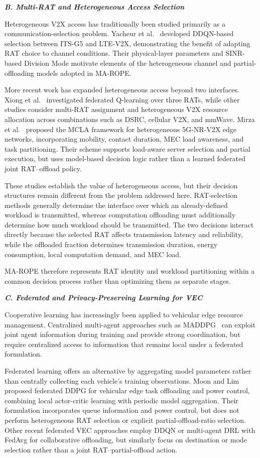 \textbf{\textit{B. Multi-RAT and Heterogeneous Access Selection}}

Heterogeneous V2X access has traditionally been studied primarily as a communication-selection problem. Yacheur et al.~\cite{yacheur2023} developed DDQN-based selection between ITS-G5 and LTE-V2X, demonstrating the benefit of adapting RAT choice to channel conditions. Their physical-layer parameters and SINR-based Division Mode motivate elements of the heterogeneous channel and partial-offloading models adopted in MA-ROPE.

More recent work has expanded heterogeneous access beyond two interfaces. Xiong et al.~\cite{xiong2021} investigated federated Q-learning over three RATs, while other studies consider multi-RAT assignment and heterogeneous V2X resource allocation across combinations such as DSRC, cellular V2X, and mmWave. Mirza et al.~\cite{mirza2023} proposed the MCLA framework for heterogeneous 5G-NR-V2X edge networks, incorporating mobility, contact duration, MEC load awareness, and task partitioning. Their scheme supports load-aware server selection and partial execution, but uses model-based decision logic rather than a learned federated joint RAT--offload policy.

These studies establish the value of heterogeneous access, but their decision structures remain different from the problem addressed here. RAT-selection methods generally determine the interface over which an already-defined workload is transmitted, whereas computation offloading must additionally determine how much workload should be transmitted. The two decisions interact directly because the selected RAT affects transmission latency and reliability, while the offloaded fraction determines transmission duration, energy consumption, local computation demand, and MEC load.

MA-ROPE therefore represents RAT identity and workload partitioning within a common decision process rather than optimizing them as separate stages.

\textbf{\textit{C. Federated and Privacy-Preserving Learning for VEC}}

Cooperative learning has increasingly been applied to vehicular edge resource management. Centralized multi-agent approaches such as MADDPG~\cite{lowe2017} can exploit joint agent information during training and provide strong coordination, but require centralized access to information that remains local under a federated formulation.

Federated learning offers an alternative by aggregating model parameters rather than centrally collecting each vehicle's training observations. Moon and Lim~\cite{moonlim2022} proposed federated DDPG for vehicular edge task offloading and power control, combining local actor-critic learning with periodic model aggregation. Their formulation incorporates queue information and power control, but does not perform heterogeneous RAT selection or explicit partial-offload-ratio selection. Other recent federated VEC approaches employ DDQN or multi-agent DRL with FedAvg for collaborative offloading, but similarly focus on destination or mode selection rather than a joint RAT--partial-offload action.

